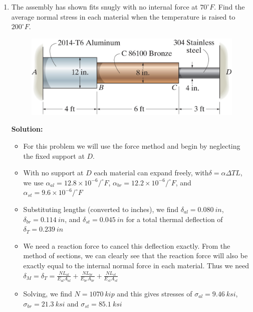 \documentclass[12pt, oneside]{article}
\let\US\SI
\begin{document}
\begin{enumerate}
	\item %
		The assembly has shown fits snugly with no internal force at $70 ^\circ F$.
		Find the average normal stress in each material when the temperature is raised to $200 ^\circ F$.
		\begin{figure}[H]
			\centering
			\includegraphics[width=0.8\linewidth]{4-69}
		\end{figure}
		\textbf{Solution:}
		\begin{itemize}
			\item For this problem we will use the force method and begin by neglecting the fixed support at $D$.
			\item With no support at $D$ each material can expand freely, with$\delta = \alpha \Delta T L$, we use $\alpha_{al} = 12.8\times 10^{-6}/^\circ F$, $\alpha_{br} = 12.2\times 10^{-6}/^\circ F$, and $\alpha_{st} = 9.6\times 10^{-6}/^\circ F$
			\item Substituting lengths (converted to inches), we find $\delta_{al} = \US{0.080}{in}$, $\delta_{br}=\US{0.114}{in}$, and $\delta_{st} = \US{0.045}{in}$ for a total thermal deflection of $\delta_T = \US{0.239}{in}$
			\item We need a reaction force to cancel this deflection exactly. From the method of sections, we can clearly see that the reaction force will also be exactly equal to the internal normal force in each material. Thus we need $\delta_M = \delta_T = \frac{N L_{al}}{E_{al}A_{al}} + \frac{N L_{br}}{E_{br}A_{br}} + \frac{N L_{st}}{E_{st}A_{st}}$
			\item Solving, we find $N = \US{1070}{kip}$ and this gives stresses of $\sigma_{al} = \US{9.46}{ksi}$, $\sigma_{br} = \US{21.3}{ksi}$ and $\sigma_{st} = \US{85.1}{ksi}$
		\end{itemize}


\end{enumerate}
\end{document}
